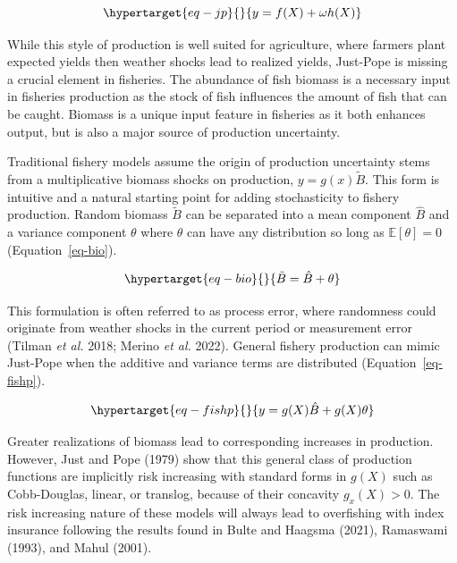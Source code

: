 \documentclass[
  letterpaper,
  DIV=11,
  numbers=noendperiod]{scrartcl}
\theoremstyle{plain}
\theoremstyle{plain}
\theoremstyle{remark}
\begin{document}
\begin{equation}\protect\hypertarget{eq-jp}{}{
y=f(X)+\omega h(X)
}\label{eq-jp}\end{equation}

While this style of production is well suited for agriculture, where
farmers plant expected yields then weather shocks lead to realized
yields, Just-Pope is missing a crucial element in fisheries. The
abundance of fish biomass is a necessary input in fisheries production
as the stock of fish influences the amount of fish that can be caught.
Biomass is a unique input feature in fisheries as it both enhances
output, but is also a major source of production uncertainty.

Traditional fishery models assume the origin of production uncertainty
stems from a multiplicative biomass shocks on production,
\(y=g(x)\tilde{B}\). This form is intuitive and a natural starting point
for adding stochasticity to fishery production. Random biomass
\(\tilde{B}\) can be separated into a mean component \(\hat{B}\) and a
variance component \(\theta\) where \(\theta\) can have any distribution
so long as \(\mathbb{E}[\theta]=0\) (Equation~\ref{eq-bio}).

\begin{equation}\protect\hypertarget{eq-bio}{}{
\tilde{B}=\hat{B}+\theta
}\label{eq-bio}\end{equation}

This formulation is often referred to as process error, where randomness
could originate from weather shocks in the current period or measurement
error (Tilman \emph{et al.} 2018; Merino \emph{et al.} 2022). General
fishery production can mimic Just-Pope when the additive and variance
terms are distributed (Equation~\ref{eq-fishp}).

\begin{equation}\protect\hypertarget{eq-fishp}{}{
y=g(X)\hat{B}+g(X)\theta
}\label{eq-fishp}\end{equation}

Greater realizations of biomass lead to corresponding increases in
production. However, Just and Pope (1979) show that this general class
of production functions are implicitly risk increasing with standard
forms in \(g(X)\) such as Cobb-Douglas, linear, or translog, because of
their concavity \(g_{x}(X)>0\). The risk increasing nature of these
models will always lead to overfishing with index insurance following
the results found in Bulte and Haagsma (2021), Ramaswami (1993), and
Mahul (2001).
\end{document}
